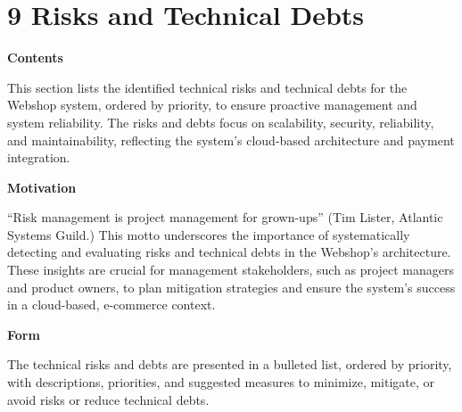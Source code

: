 \hypertarget{section-technical-risks}{%
\section{9 Risks and Technical Debts}\label{section-technical-risks}}

\textbf{Contents}

This section lists the identified technical risks and technical debts for the Webshop system, ordered by priority, to ensure proactive management and system reliability. The risks and debts focus on scalability, security, reliability, and maintainability, reflecting the system’s cloud-based architecture and payment integration.

\textbf{Motivation}

``Risk management is project management for grown-ups'' (Tim Lister, Atlantic Systems Guild.) This motto underscores the importance of systematically detecting and evaluating risks and technical debts in the Webshop’s architecture. These insights are crucial for management stakeholders, such as project managers and product owners, to plan mitigation strategies and ensure the system’s success in a cloud-based, e-commerce context.

\textbf{Form}

The technical risks and debts are presented in a bulleted list, ordered by priority, with descriptions, priorities, and suggested measures to minimize, mitigate, or avoid risks or reduce technical debts.

